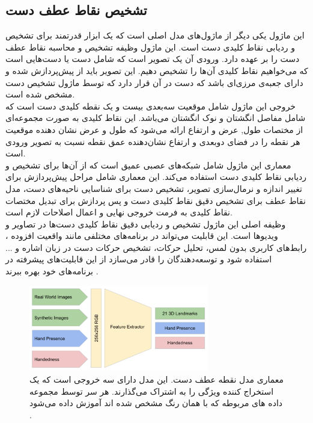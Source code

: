 \subsection{تشخیص نقاط عطف دست\protect{}}
این ماژول یکی دیگر از ماژول‌های مدل اصلی است که یک ابزار قدرتمند برای تشخیص و ردیابی نقاط کلیدی دست است. این ماژول وظیفه تشخیص و محاسبه نقاط عطف دست را بر عهده دارد. ورودی آن یک تصویر است که شامل دست یا دست‌هایی 
است که می‌خواهیم نقاط کلیدی آن‌ها را تشخیص دهیم. این تصویر باید از پیش‌پردازش شده و دارای جعبه‌ی مرزی‌ای باشد که دست در آن قرار دارد که توسط ماژول تشخیص دست مشخص شده است.
\\
خروجی این ماژول شامل موقعیت سه‌بعدی بیست و یک نقطه کلیدی دست است که شامل مفاصل انگشتان و نوک انگشتان می‌باشد. این نقاط کلیدی به صورت مجموعه‌ای از مختصات طول, عرض و ارتفاع ارائه می‌شود 
که طول و عرض نشان دهنده موقعیت هر نقطه را در فضای دوبعدی و ارتفاع نشان‌دهنده عمق نقطه نسبت به تصویر ورودی است.
\\
معماری این ماژول شامل  شبکه‌های عصبی عمیق است که از آن‌ها برای تشخیص و ردیابی نقاط کلیدی دست استفاده می‌کند. این معماری شامل مراحل پیش‌پردازش برای تغییر اندازه و نرمال‌سازی تصویر، تشخیص دست برای شناسایی ناحیه‌های دست، مدل 
نقاط عطف برای تشخیص دقیق نقاط کلیدی دست و پس‌ پردازش برای تبدیل مختصات نقاط کلیدی به فرمت خروجی نهایی و اعمال اصلاحات لازم است.
\\
وظیفه اصلی این ماژول تشخیص و ردیابی دقیق نقاط کلیدی دست‌ها در تصاویر و ویدیوها است. این قابلیت می‌تواند در برنامه‌های مختلفی مانند واقعیت افزوده ، رابط‌های کاربری بدون لمس،
تحلیل حرکات، تشخیص حرکات دست در زبان اشاره و ... استفاده شود و توسعه‌دهندگان را قادر می‌سازد از این قابلیت‌های پیشرفته در برنامه‌های خود بهره ببرند \cite{zhang2020mediapipe}.

\begin{figure}[h]
    \centering
    \includegraphics[width=0.7\textwidth]{landmark.png}
    \caption[معماری مدل نقطه عطف دست]{معماری مدل نقطه عطف دست. این مدل دارای سه خروجی است که یک استخراج کننده ویژگی را به اشتراک می‌گذارند. هر سر توسط مجموعه داده های مربوطه که با همان رنگ مشخص شده اند آموزش داده می‌شود \cite{zhang2020mediapipe}.}
\end{figure}

